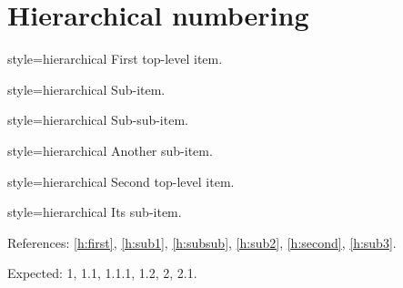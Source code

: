 \documentclass{article}
\begin{document}
\section{Hierarchical numbering}

\begin{prop}
  \item[style=hierarchical] First top-level item.
  \label{h:first}
  \begin{prop}
    \item[style=hierarchical] Sub-item.
    \label{h:sub1}
    \begin{prop}
      \item[style=hierarchical] Sub-sub-item.
      \label{h:subsub}
    \end{prop}
    \item[style=hierarchical] Another sub-item.
    \label{h:sub2}
  \end{prop}
  \item[style=hierarchical] Second top-level item.
  \label{h:second}
  \begin{prop}
    \item[style=hierarchical] Its sub-item.
    \label{h:sub3}
  \end{prop}
\end{prop}

References: \ref{h:first}, \ref{h:sub1}, \ref{h:subsub}, \ref{h:sub2},
\ref{h:second}, \ref{h:sub3}.

Expected: 1, 1.1, 1.1.1, 1.2, 2, 2.1.
\end{document}
